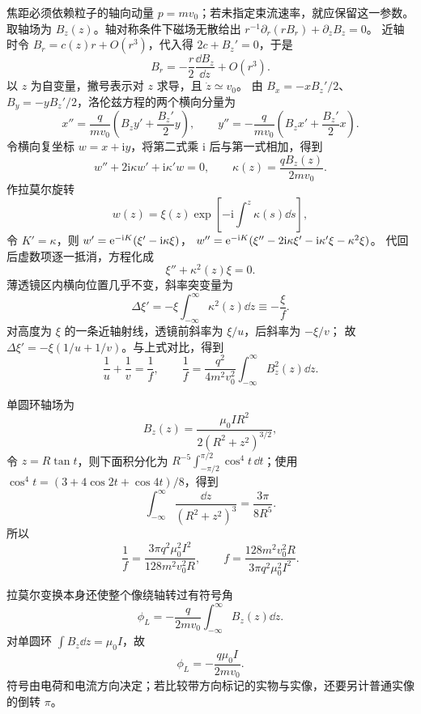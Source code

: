 {\par\pagebreak[0]
\begin{xesolution}
焦距必须依赖粒子的轴向动量 $p=mv_0$；若未指定束流速率，就应保留这一参数。
取轴场为 $B_z(z)$。轴对称条件下磁场无散给出
$r^{-1}\partial_r(rB_r)+\partial_z B_z=0$。
近轴时令 $B_r=c(z)r+O(r^3)$，代入得 $2c+B_z'=0$，于是
\begin{equation}
  B_r=-\frac r2\frac{\dd B_z}{\dd z}+O(r^3).
\end{equation}
以 $z$ 为自变量，撇号表示对 $z$ 求导，且 $\dot z\simeq v_0$。
由 $B_x=-xB_z'/2$、$B_y=-yB_z'/2$，洛伦兹方程的两个横向分量为
\[
 x''=\frac q{mv_0}\left(B_z y'+\frac{B_z'}2y\right),\qquad
 y''=-\frac q{mv_0}\left(B_z x'+\frac{B_z'}2x\right).
\]
令横向复坐标 $w=x+\mathrm i y$，将第二式乘 $\mathrm i$ 后与第一式相加，得到
\begin{equation}
  w''+2\mathrm i\kappa w'+\mathrm i\kappa'w=0,
  \qquad
  \kappa(z)=\frac{qB_z(z)}{2mv_0}.
\end{equation}
作拉莫尔旋转
\[
  w(z)=\xi(z)\exp\!\left[-\mathrm i\int^z\kappa(s)\dd s\right],
\]
令 $K'=\kappa$，则 $w'=\mathrm e^{-\mathrm iK}(\xi'-\mathrm i\kappa\xi)$，
$w''=\mathrm e^{-\mathrm iK}(\xi''-2\mathrm i\kappa\xi'-\mathrm i\kappa'\xi-\kappa^2\xi)$。
代回后虚数项逐一抵消，方程化成
\begin{equation}
  \xi''+\kappa^2(z)\xi=0.
\end{equation}
薄透镜区内横向位置几乎不变，斜率突变量为
\[
  \Delta\xi'=-\xi\int_{-\infty}^{\infty}\kappa^2(z)\dd z
  \equiv-\frac{\xi}{f}.
\]
对高度为 $\xi$ 的一条近轴射线，透镜前斜率为 $\xi/u$，后斜率为 $-\xi/v$；
故 $\Delta\xi'=-\xi(1/u+1/v)$。与上式对比，得到
\begin{equation}
  \boxed{\frac1u+\frac1v=\frac1f},
  \qquad
  \boxed{\frac1f=\frac{q^2}{4m^2v_0^2}
  \int_{-\infty}^{\infty}B_z^2(z)\dd z}.
\end{equation}

单圆环轴场为
\[
  B_z(z)=\frac{\mu_0IR^2}{2(R^2+z^2)^{3/2}},
\]
令 $z=R\tan t$，则下面积分化为
$R^{-5}\int_{-\pi/2}^{\pi/2}\cos^4t\,\dd t$；使用
$\cos^4t=(3+4\cos2t+\cos4t)/8$，得到
\[
  \int_{-\infty}^{\infty}\frac{\dd z}{(R^2+z^2)^3}
  =\frac{3\pi}{8R^5}.
\]
所以
\begin{equation}
  \boxed{\frac1f=\frac{3\pi q^2\mu_0^2I^2}{128m^2v_0^2R}},
  \qquad
  \boxed{f=\frac{128m^2v_0^2R}{3\pi q^2\mu_0^2I^2}}.
\end{equation}

拉莫尔变换本身还使整个像绕轴转过有符号角
\begin{equation}
  \phi_L=-\frac{q}{2mv_0}\int_{-\infty}^{\infty}B_z(z)\dd z.
\end{equation}
对单圆环 $\int B_z\dd z=\mu_0I$，故
\begin{equation}
  \boxed{\phi_L=-\frac{q\mu_0I}{2mv_0}}.
\end{equation}
符号由电荷和电流方向决定；若比较带方向标记的实物与实像，还要另计普通实像的倒转 $\pi$。


\end{xesolution}}
